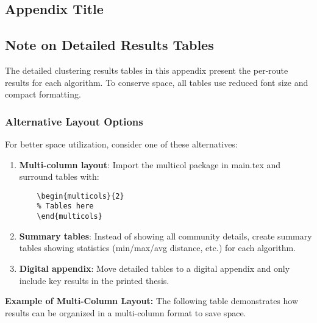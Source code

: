 \begin{appendix}
\chapter{Appendix Title}
\label{appendix:appendix}

\setlength{\tabcolsep}{3.5pt}  %
\renewcommand{\arraystretch}{0.85}  %

\newenvironment{compacttable}
{\begingroup\footnotesize}
{\endgroup}

\section*{Note on Detailed Results Tables}
The detailed clustering results tables in this appendix present the per-route results for each algorithm. To conserve space, all tables use reduced font size and compact formatting.

\subsection*{Alternative Layout Options}
For better space utilization, consider one of these alternatives:

\begin{enumerate}
    \item \textbf{Multi-column layout}: Import the multicol package in main.tex and surround tables with:
    \begin{verbatim}
    \begin{multicols}{2}
    % Tables here
    \end{multicols}
    \end{verbatim}
    
    \item \textbf{Summary tables}: Instead of showing all community details, create summary tables showing statistics (min/max/avg distance, etc.) for each algorithm.
    
    \item \textbf{Digital appendix}: Move detailed tables to a digital appendix and only include key results in the printed thesis.
\end{enumerate}

\textbf{Example of Multi-Column Layout:} The following table demonstrates how results can be organized in a multi-column format to save space.


\end{appendix}
